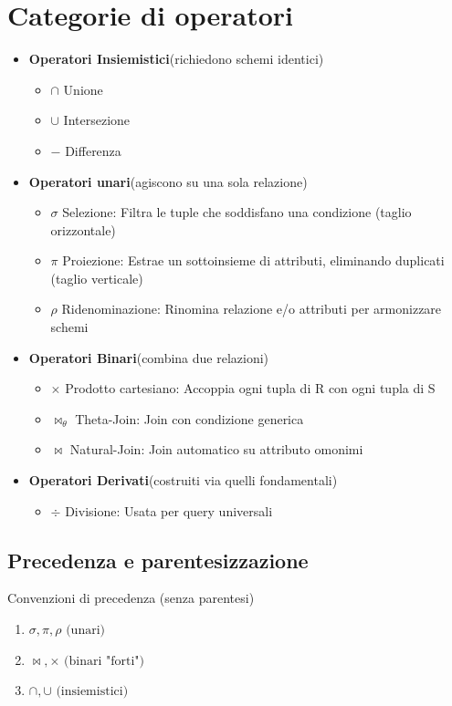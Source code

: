 \section{Categorie di operatori}
\begin{itemize}
    \item \textbf{Operatori Insiemistici}(richiedono schemi identici)
    \begin{itemize}
        \item $\cap$ Unione
        \item $\cup$ Intersezione
        \item $-$ Differenza
    \end{itemize}
    \item \textbf{Operatori unari}(agiscono su una sola relazione)
    \begin{itemize}
        \item $\sigma$ Selezione: Filtra le tuple che soddisfano una condizione (taglio orizzontale)
        \item $\pi$ Proiezione: Estrae un sottoinsieme di attributi, eliminando duplicati (taglio verticale)
        \item $\rho$ Ridenominazione: Rinomina relazione e/o attributi per armonizzare schemi
    \end{itemize}
    \item \textbf{Operatori Binari}(combina due relazioni)
    \begin{itemize}
        \item $\times$ Prodotto cartesiano: Accoppia ogni tupla di R con ogni tupla di S
        \item $\bowtie_{\theta}$ Theta-Join: Join con condizione generica
        \item $\bowtie$ Natural-Join: Join automatico su attributo omonimi
    \end{itemize}
    \item \textbf{Operatori Derivati}(costruiti via quelli fondamentali)
    \begin{itemize}
        \item $\div$ Divisione: Usata per query universali
    \end{itemize}
\end{itemize}
\subsection{Precedenza e parentesizzazione}
Convenzioni di precedenza (senza parentesi)
    \begin{enumerate}
        \item $\sigma, \pi, \rho \text{ (unari)}$
        \item $\bowtie, \times \text{ (binari "forti")}$
        \item $\cap, \cup \text{ (insiemistici)}$
    \end{enumerate}

